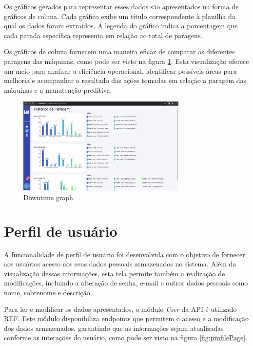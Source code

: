 Os gráficos gerados para representar esses dados são apresentados na forma de gráficos de coluna. Cada gráfico exibe um título correspondente à planilha da qual os dados foram extraídos. A legenda do gráfico indica a porcentagem que cada parada específica representa em relação ao total de paragens.

Os gráficos de coluna fornecem uma maneira eficaz de comparar as diferentes paragens das máquinas, como pode ser visto na figura \ref{fig:downtime}. Esta visualização oferece um meio para analisar a eficiência operacional, identificar possíveis áreas para melhoria e acompanhar o resultado das ações tomadas em relação a paragem das máquinas e a manutenção preditiva.

\begin{figure}[htbp]
	\centering
	\includegraphics[width=0.75\textwidth]{images/downtime.png}
	\caption{Downtime graph.}
	\label{fig:downtime}
\end{figure}

\section[Perfil de usuário]{Perfil de usuário}\label{sec:profile}

A funcionalidade de perfil de usuário foi desenvolvida com o objetivo de fornecer aos usuários acesso aos seus dados pessoais armazenados no sistema. Além da visualização dessas informações, esta tela permite também a realização de modificações, incluindo a alteração de senha, e-mail e outros dados pessoais como nome, sobrenome e descrição.

Para ler e modificar os dados apresentados, o módulo \textit{User} da \gls{API} é utilizado REF. Este módulo disponibiliza endpoints que permitem o acesso e a modificação dos dados armazenados, garantindo que as informações sejam atualizadas conforme as interações do usuário, como pode ser visto na figura \ref{fig:profilePage}.

